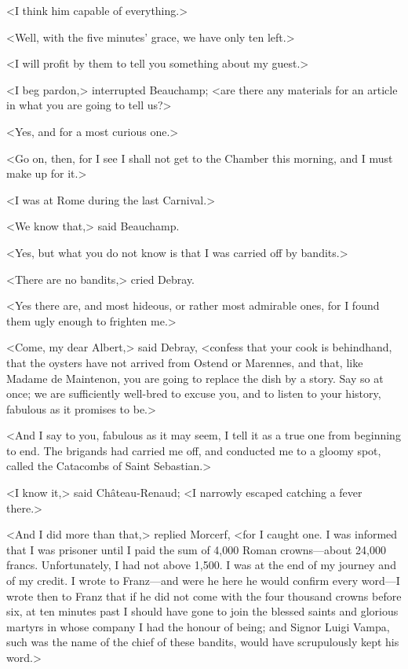  <I think him capable of everything.> 

 <Well, with the five minutes' grace, we have only ten left.> 

 <I will profit by them to tell you something about my guest.> 

 <I beg pardon,> interrupted Beauchamp; <are there any materials for an article in what you are going to tell us?> 

 <Yes, and for a most curious one.> 

 <Go on, then, for I see I shall not get to the Chamber this morning, and I must make up for it.> 

 <I was at Rome during the last Carnival.> 

 <We know that,> said Beauchamp. 

 <Yes, but what you do not know is that I was carried off by bandits.> 

 <There are no bandits,> cried Debray. 

 <Yes there are, and most hideous, or rather most admirable ones, for I found them ugly enough to frighten me.> 

 <Come, my dear Albert,> said Debray, <confess that your cook is behindhand, that the oysters have not arrived from Ostend or Marennes, and that, like Madame de Maintenon, you are going to replace the dish by a story. Say so at once; we are sufficiently well-bred to excuse you, and to listen to your history, fabulous as it promises to be.> 

 <And I say to you, fabulous as it may seem, I tell it as a true one from beginning to end. The brigands had carried me off, and conducted me to a gloomy spot, called the Catacombs of Saint Sebastian.> 

 <I know it,> said Château-Renaud; <I narrowly escaped catching a fever there.> 

 <And I did more than that,> replied Morcerf, <for I caught one. I was informed that I was prisoner until I paid the sum of 4,000 Roman crowns—about 24,000 francs. Unfortunately, I had not above 1,500. I was at the end of my journey and of my credit. I wrote to Franz—and were he here he would confirm every word—I wrote then to Franz that if he did not come with the four thousand crowns before six, at ten minutes past I should have gone to join the blessed saints and glorious martyrs in whose company I had the honour of being; and Signor Luigi Vampa, such was the name of the chief of these bandits, would have scrupulously kept his word.> 

